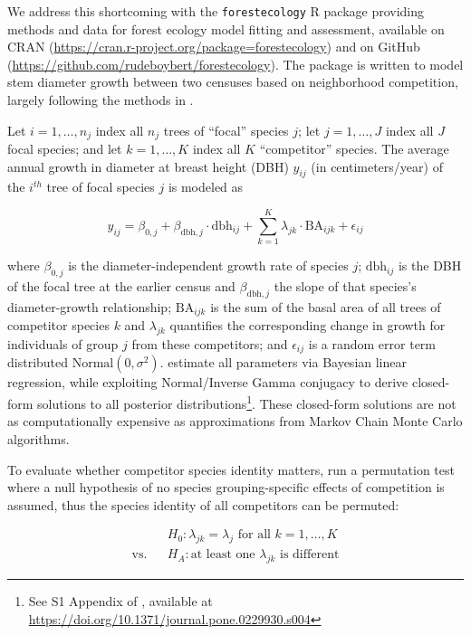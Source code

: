 \documentclass[12pt]{article}
\begin{document}
We address this shortcoming with the \texttt{forestecology} R package
providing methods and data for forest ecology model fitting and
assessment, available on CRAN
(\url{https://cran.r-project.org/package=forestecology}) and on GitHub
(\url{https://github.com/rudeboybert/forestecology}). The package is
written to model stem diameter growth between two censuses based on
neighborhood competition, largely following the methods in
\citet{allen_permutation_2020}.

Let \(i = 1, \ldots, n_j\) index all \(n_j\) trees of ``focal'' species
\(j\); let \(j = 1, \ldots, J\) index all \(J\) focal species; and let
\(k = 1, \ldots, K\) index all \(K\) ``competitor'' species. The average
annual growth in diameter at breast height (DBH) \(y_{ij}\) (in
centimeters/year) of the \(i^{th}\) tree of focal species \(j\) is
modeled as

\begin{equation}
\label{eq:model}
y_{ij} = \beta_{0,j} + \beta_{\text{dbh},j} \cdot \text{dbh}_{ij} + \sum_{k=1}^{K} \lambda_{jk} \cdot \text{BA}_{ijk} + \epsilon_{ij}
\end{equation}

where \(\beta_{0,j}\) is the diameter-independent growth rate of species
\(j\); \(\text{dbh}_{ij}\) is the DBH of the focal tree at the earlier
census and \(\beta_{\text{dbh},j}\) the slope of that species's
diameter-growth relationship; \(\text{BA}_{ijk}\) is the sum of the
basal area of all trees of competitor species \(k\) and \(\lambda_{jk}\)
quantifies the corresponding change in growth for individuals of group
\(j\) from these competitors; and \(\epsilon_{ij}\) is a random error
term distributed \(\text{Normal}(0, \sigma^2)\).
\citet{allen_permutation_2020} estimate all parameters via Bayesian
linear regression, while exploiting Normal/Inverse Gamma conjugacy to
derive closed-form solutions to all posterior distributions\footnote{See
  S1 Appendix of \citet{allen_permutation_2020}, available at
  \url{https://doi.org/10.1371/journal.pone.0229930.s004}}. These
closed-form solutions are not as computationally expensive as
approximations from Markov Chain Monte Carlo algorithms.

To evaluate whether competitor species identity matters,
\citet{allen_permutation_2020} run a permutation test where a null
hypothesis of no species grouping-specific effects of competition is
assumed, thus the species identity of all competitors can be permuted:

\begin{eqnarray}
\label{eq:permutation-hypothesis-test}
&&H_0: \lambda_{jk} = \lambda_{j} \mbox{ for all } k = 1, \ldots, K\\
\text{vs.}&&H_A: \text{at least one } \lambda_{jk} \mbox{ is different} \nonumber
\end{eqnarray}
\end{document}
